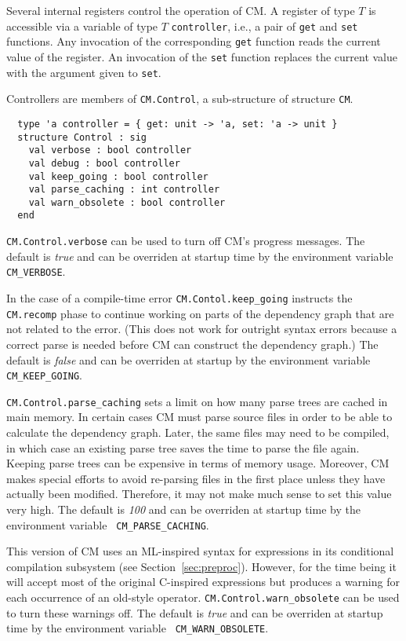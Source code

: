 \documentclass{article}
\begin{document}
Several internal registers control the operation of CM.  A register of
type $T$ is accessible via a variable of type $T$ {\tt controller},
i.e., a pair of {\tt get} and {\tt set} functions.  Any invocation of
the corresponding {\tt get} function reads the current value of the
register.  An invocation of the {\tt set} function replaces the
current value with the argument given to {\tt set}.

Controllers are members of {\tt CM.Control}, a sub-structure of
structure {\tt CM}.

\begin{verbatim}
  type 'a controller = { get: unit -> 'a, set: 'a -> unit }
  structure Control : sig
    val verbose : bool controller
    val debug : bool controller
    val keep_going : bool controller
    val parse_caching : int controller
    val warn_obsolete : bool controller
  end
\end{verbatim}

{\tt CM.Control.verbose} can be used to turn off CM's progress
messages.  The default is {\em true} and can be overriden at startup
time by the environment variable {\tt CM\_VERBOSE}.

In the case of a compile-time error {\tt CM.Contol.keep\_going}
instructs the {\tt CM.recomp} phase to continue working on parts of
the dependency graph that are not related to the error.  (This does
not work for outright syntax errors because a correct parse is needed
before CM can construct the dependency graph.)  The default is {\em
false} and can be overriden at startup by the environment variable
{\tt CM\_KEEP\_GOING}.

{\tt CM.Control.parse\_caching} sets a limit on how many parse trees
are cached in main memory.  In certain cases CM must parse source
files in order to be able to calculate the dependency graph.  Later,
the same files may need to be compiled, in which case an existing
parse tree saves the time to parse the file again.  Keeping parse
trees can be expensive in terms of memory usage.  Moreover, CM makes
special efforts to avoid re-parsing files in the first place unless
they have actually been modified.  Therefore, it may not make much
sense to set this value very high.  The default is {\em 100} and can
be overriden at startup time by the environment variable {\tt
CM\_PARSE\_CACHING}.

This version of CM uses an ML-inspired syntax for expressions in its
conditional compilation subsystem (see Section~\ref{sec:preproc}).
However, for the time being it will accept most of the original
C-inspired expressions but produces a warning for each occurrence of
an old-style operator. {\tt CM.Control.warn\_obsolete} can be used to
turn these warnings off. The default is {\em true} and can be
overriden at startup time by the environment variable {\tt
CM\_WARN\_OBSOLETE}.
\end{document}
